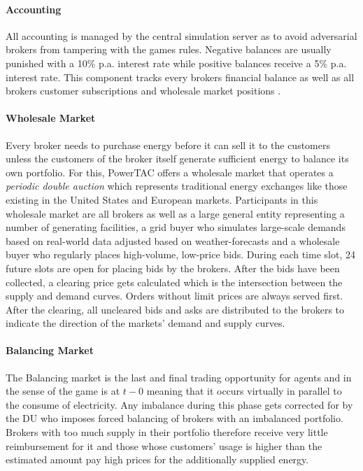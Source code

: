 \paragraph{Accounting} All accounting is managed by the central simulation server as to avoid adversarial brokers
from tampering with the games rules. Negative balances are usually punished with a 10\% p.a. interest rate while
positive balances receive a 5\% p.a. interest rate. This component tracks every brokers financial balance as well as
all brokers customer subscriptions and wholesale market positions \citep[p.11]{ketter2018powertac}.

\paragraph{Wholesale Market}
Every broker needs to purchase energy before it can sell it to the customers unless the customers of the broker itself
generate sufficient energy to balance its own portfolio. For this, \ac{PowerTAC} offers a wholesale market that operates
a \emph{periodic double auction} which represents traditional energy exchanges like those existing in the United States
and European markets. Participants in this wholesale market are all brokers as well as a large general entity
representing a number of generating facilities, a grid buyer who simulates large-scale demands based on real-world data
adjusted based on weather-forecasts and a wholesale buyer who regularly places high-volume, low-price bids. During each
time slot, 24 future slots are open for placing bids by the brokers. After the bids have been collected, a clearing
price gets calculated which is the intersection between the supply and demand curves. Orders without limit prices are
always served first. After the clearing, all uncleared bids and asks are distributed to the brokers to indicate the
direction of the markets' demand and supply curves.

\paragraph{Balancing Market} The Balancing market is the last and final trading opportunity for agents and in the
sense of the game is at $t-0$ meaning that it occurs virtually in parallel to the consume of electricity. Any imbalance
during this phase gets corrected for by the \ac{DU} who imposes forced balancing of brokers with an imbalanced
portfolio. Brokers with too much supply in their portfolio therefore receive very little reimbursement for it and those
whose customers' usage is higher than the estimated amount pay high prices for the additionally supplied energy.

